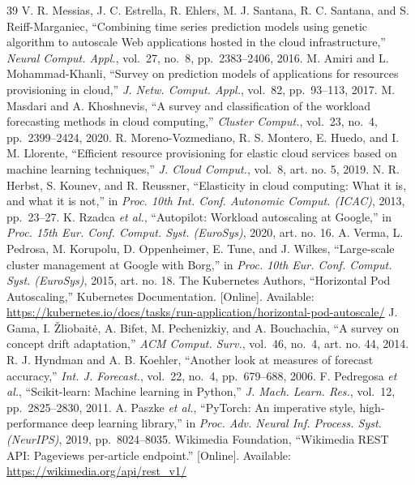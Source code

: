 \documentclass[journal,onecolumn,11pt]{IEEEtran}
\begin{document}
\begin{thebibliography}{39}
 V. R. Messias, J. C. Estrella, R. Ehlers, M. J. Santana, R. C. Santana, and S. Reiff-Marganiec, ``Combining time series prediction models using genetic algorithm to autoscale Web applications hosted in the cloud infrastructure,'' \emph{Neural Comput. Appl.}, vol.~27, no.~8, pp.~2383--2406, 2016.
 M. Amiri and L. Mohammad-Khanli, ``Survey on prediction models of applications for resources provisioning in cloud,'' \emph{J. Netw. Comput. Appl.}, vol.~82, pp.~93--113, 2017.
 M. Masdari and A. Khoshnevis, ``A survey and classification of the workload forecasting methods in cloud computing,'' \emph{Cluster Comput.}, vol.~23, no.~4, pp.~2399--2424, 2020.
 R. Moreno-Vozmediano, R. S. Montero, E. Huedo, and I. M. Llorente, ``Efficient resource provisioning for elastic cloud services based on machine learning techniques,'' \emph{J. Cloud Comput.}, vol.~8, art. no. 5, 2019.
 N. R. Herbst, S. Kounev, and R. Reussner, ``Elasticity in cloud computing: What it is, and what it is not,'' in \emph{Proc. 10th Int. Conf. Autonomic Comput. (ICAC)}, 2013, pp.~23--27.
 K. Rzadca \emph{et al.}, ``Autopilot: Workload autoscaling at Google,'' in \emph{Proc. 15th Eur. Conf. Comput. Syst. (EuroSys)}, 2020, art. no. 16.
 A. Verma, L. Pedrosa, M. Korupolu, D. Oppenheimer, E. Tune, and J. Wilkes, ``Large-scale cluster management at Google with Borg,'' in \emph{Proc. 10th Eur. Conf. Comput. Syst. (EuroSys)}, 2015, art. no. 18.
 The Kubernetes Authors, ``Horizontal Pod Autoscaling,'' Kubernetes Documentation. [Online]. Available: \url{https://kubernetes.io/docs/tasks/run-application/horizontal-pod-autoscale/}
\enlargethispage{3\baselineskip}
 J. Gama, I. \v{Z}liobait\.{e}, A. Bifet, M. Pechenizkiy, and A. Bouchachia, ``A survey on concept drift adaptation,'' \emph{ACM Comput. Surv.}, vol.~46, no.~4, art. no. 44, 2014.
 R. J. Hyndman and A. B. Koehler, ``Another look at measures of forecast accuracy,'' \emph{Int. J. Forecast.}, vol.~22, no.~4, pp.~679--688, 2006.
 F. Pedregosa \emph{et al.}, ``Scikit-learn: Machine learning in Python,'' \emph{J. Mach. Learn. Res.}, vol.~12, pp.~2825--2830, 2011.
 A. Paszke \emph{et al.}, ``PyTorch: An imperative style, high-performance deep learning library,'' in \emph{Proc. Adv. Neural Inf. Process. Syst. (NeurIPS)}, 2019, pp.~8024--8035.
 Wikimedia Foundation, ``Wikimedia REST API: Pageviews per-article endpoint.'' [Online]. Available: \url{https://wikimedia.org/api/rest_v1/}
\end{thebibliography}
\end{document}
